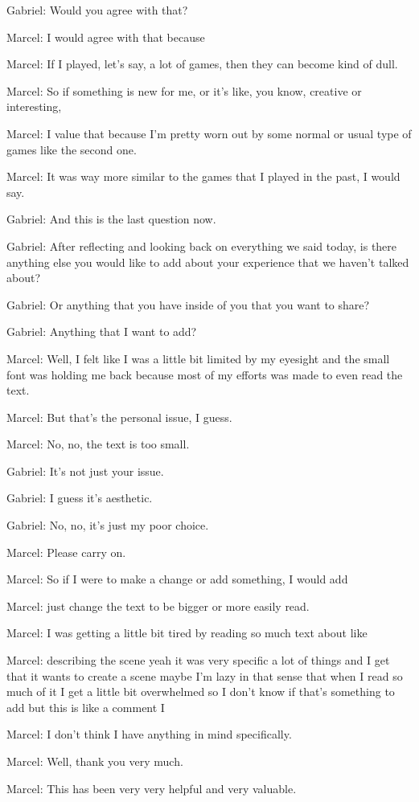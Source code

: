 Gabriel: Would you agree with that?

Marcel: I would agree with that because

Marcel: If I played, let's say, a lot of games, then they can become kind of dull.

Marcel: So if something is new for me, or it's like, you know, creative or interesting,

Marcel: I value that because I'm pretty worn out by some normal or usual type of games like the second one.

Marcel: It was way more similar to the games that I played in the past, I would say.

Gabriel: And this is the last question now.

Gabriel: After reflecting and looking back on everything we said today, is there anything else you would like to add about your experience that we haven't talked about?

Gabriel: Or anything that you have inside of you that you want to share?

Gabriel: Anything that I want to add?

Marcel: Well, I felt like I was a little bit limited by my eyesight and the small font was holding me back because most of my efforts was made to even read the text.

Marcel: But that's the personal issue, I guess.

Marcel: No, no, the text is too small.

Gabriel: It's not just your issue.

Gabriel: I guess it's aesthetic.

Gabriel: No, no, it's just my poor choice.

Marcel: Please carry on.

Marcel: So if I were to make a change or add something, I would add

Marcel: just change the text to be bigger or more easily read.

Marcel: I was getting a little bit tired by reading so much text about like

Marcel: describing the scene yeah it was very specific a lot of things and I get that it wants to create a scene maybe I'm lazy in that sense that when I read so much of it I get a little bit overwhelmed so I don't know if that's something to add but this is like a comment I

Marcel: I don't think I have anything in mind specifically.

Marcel: Well, thank you very much.

Marcel: This has been very very helpful and very valuable.








